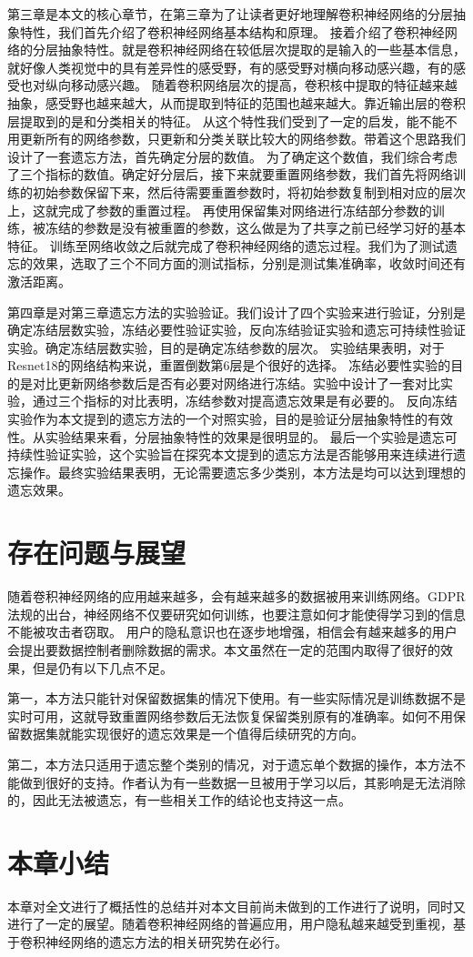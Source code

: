 第三章是本文的核心章节，在第三章为了让读者更好地理解卷积神经网络的分层抽象特性，我们首先介绍了卷积神经网络基本结构和原理。
接着介绍了卷积神经网络的分层抽象特性。就是卷积神经网络在较低层次提取的是输入的一些基本信息，就好像人类视觉中的具有差异性的感受野，有的感受野对横向移动感兴趣，有的感受也对纵向移动感兴趣。
随着卷积网络层次的提高，卷积核中提取的特征越来越抽象，感受野也越来越大，从而提取到特征的范围也越来越大。靠近输出层的卷积层提取到的是和分类相关的特征。
从这个特性我们受到了一定的启发，能不能不用更新所有的网络参数，只更新和分类关联比较大的网络参数。带着这个思路我们设计了一套遗忘方法，首先确定分层的数值。
为了确定这个数值，我们综合考虑了三个指标的数值。确定好分层后，接下来就要重置网络参数，我们首先将网络训练的初始参数保留下来，然后待需要重置参数时，将初始参数复制到相对应的层次上，这就完成了参数的重置过程。
再使用保留集对网络进行冻结部分参数的训练，被冻结的参数是没有被重置的参数，这么做是为了共享之前已经学习好的基本特征。
训练至网络收敛之后就完成了卷积神经网络的遗忘过程。我们为了测试遗忘的效果，选取了三个不同方面的测试指标，分别是测试集准确率，收敛时间还有激活距离。

第四章是对第三章遗忘方法的实验验证。我们设计了四个实验来进行验证，分别是确定冻结层数实验，冻结必要性验证实验，反向冻结验证实验和遗忘可持续性验证实验。确定冻结层数实验，目的是确定冻结参数的层次。
实验结果表明，对于Resnet18的网络结构来说，重置倒数第6层是个很好的选择。
冻结必要性实验的目的是对比更新网络参数后是否有必要对网络进行冻结。实验中设计了一套对比实验，通过三个指标的对比表明，冻结参数对提高遗忘效果是有必要的。
反向冻结实验作为本文提到的遗忘方法的一个对照实验，目的是验证分层抽象特性的有效性。从实验结果来看，分层抽象特性的效果是很明显的。
最后一个实验是遗忘可持续性验证实验，这个实验旨在探究本文提到的遗忘方法是否能够用来连续进行遗忘操作。最终实验结果表明，无论需要遗忘多少类别，本方法是均可以达到理想的遗忘效果。

\section{存在问题与展望}
随着卷积神经网络的应用越来越多，会有越来越多的数据被用来训练网络。GDPR法规的出台，神经网络不仅要研究如何训练，也要注意如何才能使得学习到的信息不能被攻击者窃取。
用户的隐私意识也在逐步地增强，相信会有越来越多的用户会提出要数据控制者删除数据的需求。本文虽然在一定的范围内取得了很好的效果，但是仍有以下几点不足。

第一，本方法只能针对保留数据集的情况下使用。有一些实际情况是训练数据不是实时可用，这就导致重置网络参数后无法恢复保留类别原有的准确率。如何不用保留数据集就能实现很好的遗忘效果是一个值得后续研究的方向。

第二，本方法只适用于遗忘整个类别的情况，对于遗忘单个数据的操作，本方法不能做到很好的支持。作者认为有一些数据一旦被用于学习以后，其影响是无法消除的，因此无法被遗忘，有一些相关工作\cite{2018arXiv181205159T}的结论也支持这一点。

\section{本章小结}
本章对全文进行了概括性的总结并对本文目前尚未做到的工作进行了说明，同时又进行了一定的展望。随着卷积神经网络的普遍应用，用户隐私越来越受到重视，基于卷积神经网络的遗忘方法的相关研究势在必行。